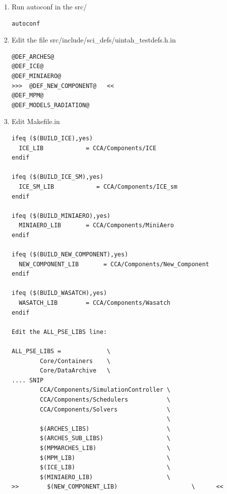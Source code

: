 \documentclass[12pt]{report}
\begin{document}
\begin{enumerate}
\begin{verbatim}
if test "$USE_NEW_COMPONENT" != ""; then
   AC_MSG_ERROR( USE_NEW_COMPONENT is deprecated.  Please use --enable-new_component. )
fi


AC_SUBST(BUILD_ARCHES)
AC_SUBST(BUILD_ICE)
AC_SUBST(BUILD_ICE_SM)
AC_SUBST(BUILD_MINIAERO)
>>  AC_SUBST(BUILD_NEW_COMPONENT)    <<
AC_SUBST(BUILD_MODELS_RADIATION)
AC_SUBST(BUILD_MPM)
AC_SUBST(BUILD_WASATCH)

AC_SUBST(DEF_ARCHES)
AC_SUBST(DEF_ICE)
AC_SUBST(DEF_ICE_SM)
AC_SUBST(DEF_MINIAERO)
>> AC_SUBST(DEF_NEW_COMPONENT)   <<
AC_SUBST(DEF_MPM)
AC_SUBST(DEF_NO_FORTRAN)
AC_SUBST(DEF_MODELS_RADIATION)
AC_SUBST(DEF_WASATCH)
AC_SUBST(NO_FORTRAN)
\end{verbatim}

\item  Run autoconf in the src/ 
\begin{verbatim}
autoconf
\end{verbatim}

\item  Edit the file src/include/sci\_defs/uintah\_testdefs.h.in

\begin{verbatim}
@DEF_ARCHES@
@DEF_ICE@
@DEF_MINIAERO@
>>>  @DEF_NEW_COMPONENT@   <<
@DEF_MPM@
@DEF_MODELS_RADIATION@
\end{verbatim}

\item  Edit Makefile.in

\begin{verbatim}
ifeq ($(BUILD_ICE),yes)
  ICE_LIB            = CCA/Components/ICE
endif

ifeq ($(BUILD_ICE_SM),yes)
  ICE_SM_LIB            = CCA/Components/ICE_sm
endif

ifeq ($(BUILD_MINIAERO),yes)
  MINIAERO_LIB       = CCA/Components/MiniAero
endif

ifeq ($(BUILD_NEW_COMPONENT),yes)
  NEW_COMPONENT_LIB       = CCA/Components/New_Component
endif

ifeq ($(BUILD_WASATCH),yes)
  WASATCH_LIB        = CCA/Components/Wasatch
endif

Edit the ALL_PSE_LIBS line:

ALL_PSE_LIBS =             \
        Core/Containers    \
        Core/DataArchive   \
.... SNIP
        CCA/Components/SimulationController \
        CCA/Components/Schedulers           \
        CCA/Components/Solvers              \
                                            \
        $(ARCHES_LIBS)                      \
        $(ARCHES_SUB_LIBS)                  \
        $(MPMARCHES_LIB)                    \
        $(MPM_LIB)                          \
        $(ICE_LIB)                          \
        $(MINIAERO_LIB)                     \
>>        $(NEW_COMPONENT_LIB)                     \      <<
\end{verbatim}


\end{enumerate}
\end{document}

